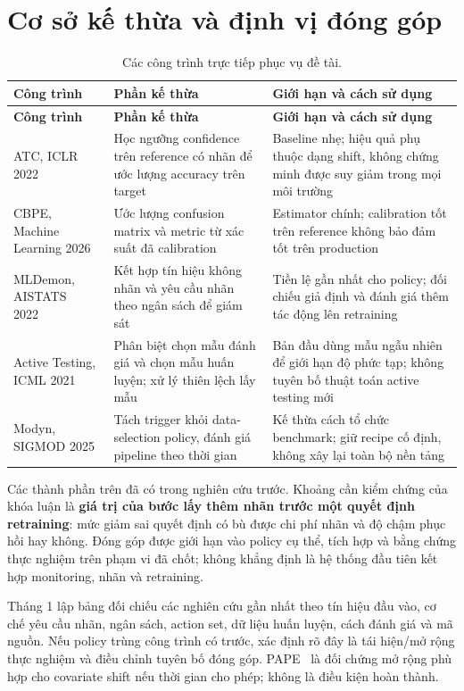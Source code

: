 \section{Cơ sở kế thừa và định vị đóng góp}
\begin{xltabular}{\linewidth}{@{}L{3.1cm} Y Y@{}}
\caption{Các công trình trực tiếp phục vụ đề tài.}\label{tab:related}\\
\toprule
\textbf{Công trình} & \textbf{Phần kế thừa} & \textbf{Giới hạn và cách sử dụng} \\
\midrule\endfirsthead
\toprule\textbf{Công trình} & \textbf{Phần kế thừa} & \textbf{Giới hạn và cách sử dụng} \\
\midrule\endhead
ATC, ICLR 2022~\cite{atc} & Học ngưỡng confidence trên reference có nhãn để ước lượng accuracy trên target & Baseline nhẹ; hiệu quả phụ thuộc dạng shift, không chứng minh được suy giảm trong mọi môi trường \\
CBPE, Machine Learning 2026~\cite{cbpe} & Ước lượng confusion matrix và metric từ xác suất đã calibration & Estimator chính; calibration tốt trên reference không bảo đảm tốt trên production \\
MLDemon, AISTATS 2022~\cite{mldemon} & Kết hợp tín hiệu không nhãn và yêu cầu nhãn theo ngân sách để giám sát & Tiền lệ gần nhất cho policy; đối chiếu giả định và đánh giá thêm tác động lên retraining \\
Active Testing, ICML 2021~\cite{active_testing} & Phân biệt chọn mẫu đánh giá và chọn mẫu huấn luyện; xử lý thiên lệch lấy mẫu & Bản đầu dùng mẫu ngẫu nhiên để giới hạn độ phức tạp; không tuyên bố thuật toán active testing mới \\
Modyn, SIGMOD 2025~\cite{modyn} & Tách trigger khỏi data-selection policy, đánh giá pipeline theo thời gian & Kế thừa cách tổ chức benchmark; giữ recipe cố định, không xây lại toàn bộ nền tảng \\
\bottomrule
\end{xltabular}

Các thành phần trên đã có trong nghiên cứu trước. Khoảng cần kiểm chứng của khóa luận là \textbf{giá trị của bước lấy thêm nhãn trước một quyết định retraining}: mức giảm sai quyết định có bù được chi phí nhãn và độ chậm phục hồi hay không. Đóng góp được giới hạn vào policy cụ thể, tích hợp và bằng chứng thực nghiệm trên phạm vi đã chốt; không khẳng định là hệ thống đầu tiên kết hợp monitoring, nhãn và retraining.

Tháng 1 lập bảng đối chiếu các nghiên cứu gần nhất theo tín hiệu đầu vào, cơ chế yêu cầu nhãn, ngân sách, action set, dữ liệu huấn luyện, cách đánh giá và mã nguồn. Nếu policy trùng công trình có trước, xác định rõ đây là tái hiện/mở rộng thực nghiệm và điều chỉnh tuyên bố đóng góp. PAPE~\cite{pape} là đối chứng mở rộng phù hợp cho covariate shift nếu thời gian cho phép; không là điều kiện hoàn thành.
